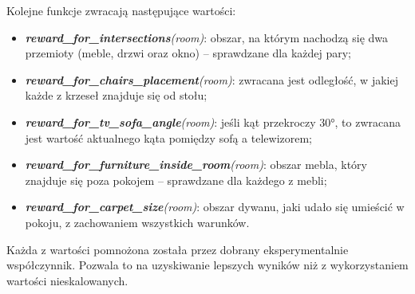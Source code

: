 Kolejne funkcje zwracają następujące wartości:

\begin{itemize}
	\item \emph{\textbf{reward\_for\_intersections}(room)}: obszar, na którym nachodzą się dwa przemioty (meble, drzwi oraz okno) -- sprawdzane dla każdej pary;
	\item \emph{\textbf{reward\_for\_chairs\_placement}(room)}: zwracana jest odległość, w jakiej każde z krzeseł znajduje się od stołu;
	\item \emph{\textbf{reward\_for\_tv\_sofa\_angle}(room)}: jeśli kąt przekroczy \ang{30}, to zwracana jest wartość aktualnego kąta pomiędzy sofą a telewizorem;
	\item \emph{\textbf{reward\_for\_furniture\_inside\_room}(room)}: obszar mebla, który znajduje się poza pokojem -- sprawdzane dla każdego z mebli;
	\item \emph{\textbf{reward\_for\_carpet\_size}(room)}: obszar dywanu, jaki udało się umieścić w pokoju, z zachowaniem wszystkich warunków.
\end{itemize}

Każda z wartości pomnożona została przez dobrany eksperymentalnie współczynnik. Pozwala to na uzyskiwanie lepszych wyników niż z wykorzystaniem wartości nieskalowanych.

